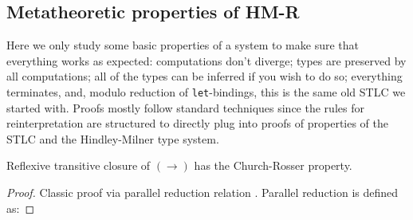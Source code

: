 \subsection{Metatheoretic properties of HM-R}
\label{HM-R-properties}

Here we only study some basic properties of a system to
make sure that everything works as expected:
computations don't diverge; types are preserved by all
computations; all of the types can be inferred if you
wish to do so; everything terminates, and, modulo
reduction of \texttt{let}-bindings, this is the same old
STLC we started with. Proofs mostly follow
standard techniques since the rules for reinterpretation
are structured to directly plug into proofs of
properties of the STLC and the Hindley-Milner type system.

\begin{theorem}
    Reflexive transitive closure of $(\to)$ has
    the Church-Rosser property.
\end{theorem}
\begin{proof}
    Classic proof via parallel reduction relation
    \cite{CRproof}. Parallel reduction is defined as:
\end{proof}

